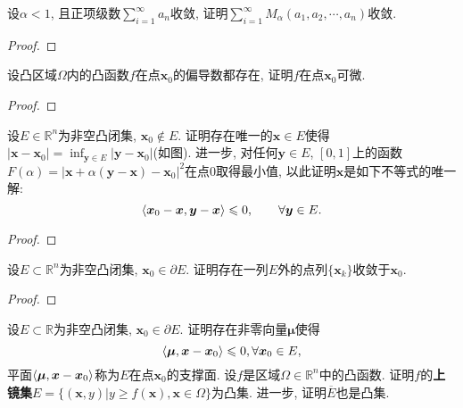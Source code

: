 \begin{quizb}
\woe 设\(\alpha<1\), 且正项级数\(\sum_{i=1}^{\infty}a_n\)收敛, 证明\(\sum_{i=1}^{\infty}M_{\alpha}\left(a_1,a_2,\cdots,a_n\right)\)收敛.
\begin{proof}

\end{proof}
\woe 设凸区域\(\varOmega\)内的凸函数\(f\)在点\(\boldsymbol{x}_0\)的偏导数都存在, 证明\(f\)在点\(\boldsymbol{x}_0\)可微.
\begin{proof}

\end{proof}
\woe 设\(E\in\mathbb{R}^n\)为非空凸闭集, \(\boldsymbol{x}_0\notin E\). 证明存在唯一的\(\boldsymbol{x}\in E\)使得\(|\boldsymbol{x}-\boldsymbol{x}_0|=\inf_{\boldsymbol{y}\in E}|\boldsymbol{y}-\boldsymbol{x}_0|\)(如图). 进一步, 对任何\(\boldsymbol{y}\in E\), \([0,1]\)上的函数\(F(\alpha)=|\boldsymbol{x}+\alpha\left(\boldsymbol{y}-\boldsymbol{x}\right)-\boldsymbol{x}_0|^2\)在点\(0\)取得最小值, 以此证明\(\boldsymbol{x}\)是如下不等式的唯一解:\[\langle \boldsymbol{x}_0-\boldsymbol{x},\boldsymbol{y}-\boldsymbol{x} \rangle\leqslant 0,\qquad\forall\boldsymbol{y}\in E.\]
\begin{proof}

\end{proof}
\woe 设\(E\subset\mathbb{R}^n\)为非空凸闭集, \(\boldsymbol{x}_0\in\partial E\). 证明存在一列\(E\)外的点列\(\{\boldsymbol{x}_k\}\)收敛于\(\boldsymbol{x}_0\).
\begin{proof}

\end{proof}
\woe 设\(E\subset\mathbb{R}\)为非空凸闭集, \(\boldsymbol{x}_0\in\partial E\). 证明存在非零向量\(\boldsymbol{\mu}\)使得\[\langle \boldsymbol{\mu},\boldsymbol{x}-\boldsymbol{x}_0 \rangle\leqslant 0,\forall\boldsymbol{x}_0\in E,\]平面\(\langle \boldsymbol{\mu},\boldsymbol{x}-\boldsymbol{x}_0 \rangle\)称为\(E\)在点\(\boldsymbol{x}_0\)的支撑面.
\woe 设\(f\)是区域\(\varOmega\in\mathbb{R}^n\)中的凸函数. 证明\(f\)的\textbf{上镜集}\(E=\{(\boldsymbol{x},y)\big|y\geqslant f(\boldsymbol{x}),\boldsymbol{x}\in\varOmega\}\)为凸集. 进一步, 证明\(\overline{E}\)也是凸集.


\end{quizb}
